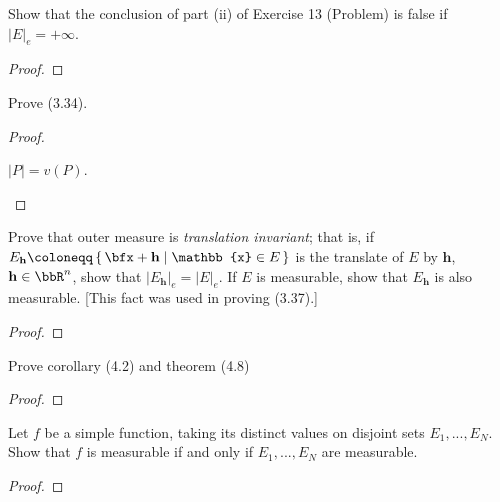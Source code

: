 \begin{problem}
Show that the conclusion of part  (ii) of Exercise 13 (Problem) is false if
$\left|E\right|_e=+\infty$.
\end{problem}
\begin{proof}

\end{proof}
\newpage

\begin{problem}
Prove (3.34).
\end{problem}
\begin{proof}
\begin{lemma*}
$\left|P\right|=v(P)$.
\end{lemma*}
\end{proof}
\newpage

\begin{problem}
Prove that outer measure is \emph{translation invariant}; that is, if
$E_{\textbf{h}}\coloneqq\left\{\,\bfx+\mathbf{h}\;\middle|\;\mathbb{x}\in
  E\,\right\}$ is the translate of $E$ by $\mathbf{h}$,
$\mathbf{h}\in\bbR^n$, show that
$\left|E_{\mathbf{h}}\right|_e=\left|E\right|_e$. If $E$ is measurable,
show that $E_{\mathbf{h}}$ is also measurable. [This fact was used in
proving (3.37).]
\end{problem}
\begin{proof}
\end{proof}
\newpage

\begin{problem}
Prove corollary (4.2) and theorem (4.8)
\end{problem}
\begin{proof}
\end{proof}
\newpage

\begin{problem}
Let $f$ be a simple function, taking its distinct values on disjoint sets
$E_1,...,E_N$. Show that $f$ is measurable if and only if $E_1,...,E_N$ are
measurable.
\end{problem}
\begin{proof}
\end{proof}

